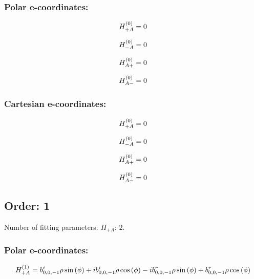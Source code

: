 \documentclass[fleqn]{article}
\begin{document}
\subsubsection*{Polar e-coordinates:}

\begin{dmath*}
H_{+A}^{(0)}=0\\
\end{dmath*}

\begin{dmath*}
H_{-A}^{(0)}=0\\
\end{dmath*}

\begin{dmath*}
H_{A+}^{(0)}=0\\
\end{dmath*}

\begin{dmath*}
H_{A-}^{(0)}=0\\
\end{dmath*}
\subsubsection*{Cartesian e-coordinates:}

\begin{dmath*}
H_{+A}^{(0)}=0\\
\end{dmath*}

\begin{dmath*}
H_{-A}^{(0)}=0\\
\end{dmath*}

\begin{dmath*}
H_{A+}^{(0)}=0\\
\end{dmath*}

\begin{dmath*}
H_{A-}^{(0)}=0\\
\end{dmath*}
\subsection{Order: 1}
Number of fitting parameters: $H_{+A}$: $2$.
\subsubsection*{Polar e-coordinates:}

\begin{dmath*}
H_{+A}^{(1)}=b^{i}_{0,0,-1} \rho \sin{\left (\phi \right )} +  i b^{i}_{0,0,-1} \rho \cos{\left (\phi \right )} -  i b^{r}_{0,0,-1} \rho \sin{\left (\phi \right )} + b^{r}_{0,0,-1} \rho \cos{\left (\phi \right )}\\
\end{dmath*}
\end{document}
